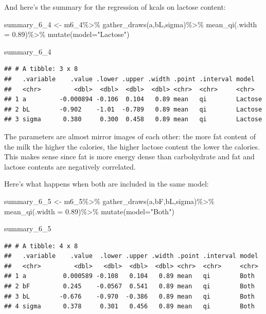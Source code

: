 \documentclass[
]{book}
\newenvironment{Shaded}{\begin{snugshade}}{\end{snugshade}}
\newcommand{\AttributeTok}[1]{\textcolor[rgb]{0.77,0.63,0.00}{#1}}
\newcommand{\FloatTok}[1]{\textcolor[rgb]{0.00,0.00,0.81}{#1}}
\newcommand{\FunctionTok}[1]{\textcolor[rgb]{0.00,0.00,0.00}{#1}}
\newcommand{\NormalTok}[1]{#1}
\newcommand{\OtherTok}[1]{\textcolor[rgb]{0.56,0.35,0.01}{#1}}
\newcommand{\SpecialCharTok}[1]{\textcolor[rgb]{0.00,0.00,0.00}{#1}}
\newcommand{\StringTok}[1]{\textcolor[rgb]{0.31,0.60,0.02}{#1}}
\begin{document}
And here's the summary for the regression of kcals on lactose content:

\begin{Shaded}
\begin{Highlighting}[]
\NormalTok{summary\_6\_4 }\OtherTok{\textless{}{-}}\NormalTok{ m6\_4}\SpecialCharTok{\%\textgreater{}\%}
  \FunctionTok{gather\_draws}\NormalTok{(a,bL,sigma)}\SpecialCharTok{\%\textgreater{}\%}
  \FunctionTok{mean\_qi}\NormalTok{(}\AttributeTok{.width =} \FloatTok{0.89}\NormalTok{)}\SpecialCharTok{\%\textgreater{}\%}
  \FunctionTok{mutate}\NormalTok{(}\AttributeTok{model=}\StringTok{"Lactose"}\NormalTok{)}

\NormalTok{summary\_6\_4}
\end{Highlighting}
\end{Shaded}

\begin{verbatim}
## # A tibble: 3 x 8
##   .variable    .value .lower .upper .width .point .interval model  
##   <chr>         <dbl>  <dbl>  <dbl>  <dbl> <chr>  <chr>     <chr>  
## 1 a         -0.000894 -0.106  0.104   0.89 mean   qi        Lactose
## 2 bL        -0.902    -1.01  -0.789   0.89 mean   qi        Lactose
## 3 sigma      0.380     0.300  0.458   0.89 mean   qi        Lactose
\end{verbatim}

The parameters are almost mirror images of each other: the more fat content of the milk the higher the calories, the higher lactose content the lower the calories. This makes sense since fat is more energy dense than carbohydrate and fat and lactose contents are negatively correlated.

Here's what happens when both are included in the same model:

\begin{Shaded}
\begin{Highlighting}[]
\NormalTok{summary\_6\_5 }\OtherTok{\textless{}{-}}\NormalTok{ m6\_5}\SpecialCharTok{\%\textgreater{}\%}
  \FunctionTok{gather\_draws}\NormalTok{(a,bF,bL,sigma)}\SpecialCharTok{\%\textgreater{}\%}
  \FunctionTok{mean\_qi}\NormalTok{(}\AttributeTok{.width =} \FloatTok{0.89}\NormalTok{)}\SpecialCharTok{\%\textgreater{}\%}
  \FunctionTok{mutate}\NormalTok{(}\AttributeTok{model=}\StringTok{"Both"}\NormalTok{)}

\NormalTok{summary\_6\_5}
\end{Highlighting}
\end{Shaded}

\begin{verbatim}
## # A tibble: 4 x 8
##   .variable    .value  .lower .upper .width .point .interval model
##   <chr>         <dbl>   <dbl>  <dbl>  <dbl> <chr>  <chr>     <chr>
## 1 a          0.000589 -0.108   0.104   0.89 mean   qi        Both 
## 2 bF         0.245    -0.0567  0.541   0.89 mean   qi        Both 
## 3 bL        -0.676    -0.970  -0.386   0.89 mean   qi        Both 
## 4 sigma      0.378     0.301   0.456   0.89 mean   qi        Both
\end{verbatim}
\end{document}
